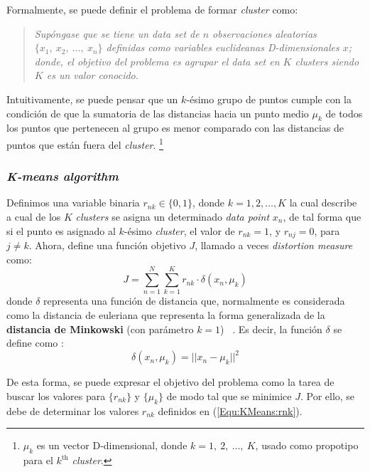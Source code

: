 Formalmente, se puede definir el problema de formar \textit{cluster} como:
\begin{quotation}
\small
\textsl{
Supóngase que se tiene un \textit{data set} de $n$ observaciones aleatorias
$\lbrace x_1,~ x_2,~ \dots,~ x_n \rbrace$ definidas como variables euclideanas
D-dimensionales $x$; donde, el objetivo del problema es agrupar el 
\textit{data set} en $K$ \textit{clusters} siendo $K$ es un valor conocido.}
\end{quotation}

Intuitivamente, se puede pensar que un $k$-ésimo grupo de puntos cumple con la
condición de que la sumatoria de las distancias hacia un punto medio $\mu_k$ 
de todos los puntos que pertenecen al grupo es menor comparado con las 
distancias de puntos que están fuera del \textit{cluster}. \footnote{$\mu_k$ 
es un vector D-dimensional, donde $k=1,~ 2,~ \dots,~ K$, usado como propotipo
para el $k^\text{th}$ \textit{cluster}.}

\subsubsection{\textit{K-means algorithm}}
Definimos una variable binaria $r_{nk} \in \lbrace 0,1 \rbrace $, donde
$k=1,2,\dots, K$ la cual describe a cual de los $K$ \textit{clusters} se
asigna un determinado \textit{data point} $x_n$, de tal forma que si el punto
es asignado al $k$-ésimo \textit{cluster}, el valor de $r_{nk} = 1$, y 
$r_{nj} = 0$, para $j \neq k$. Ahora, define una función objetivo $J$, llamado 
a veces \textit{distortion measure} como:
\begin{equation}
  J = \sum_{n=1}^N{\sum_{k=1}^K{r_{nk} \cdot \delta (x_n, \mu_{k})}}
  \label{Equ:J_kmeans}
\end{equation}
donde $\delta$ representa una función de distancia que, normalmente es
considerada como la distancia de euleriana que representa la forma 
generalizada de la \textbf{distancia de Minkowski} (con parámetro $k=1$)~
\cite[pág. 353]{Webb:2003:SPR}. %
Es decir, la función $\delta$ se define como :
\begin{equation}
  \delta (x_n, \mu_k) = ||x_n - \mu_k||^2
\end{equation}

De esta forma, se puede expresar el objetivo del problema como la tarea de
buscar los valores para $\lbrace r_{nk} \rbrace$ y $\lbrace \mu_k \rbrace$ de
modo tal que se minimice $J$. Por ello, se debe de determinar los valores
$r_{nk}$ definidos en (\ref{Equ:KMeans:rnk}).


